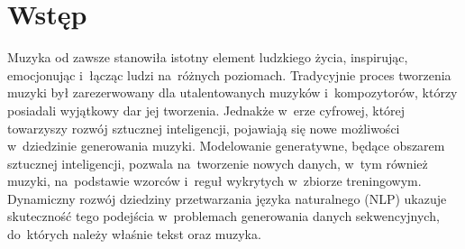 \documentclass[data-science]{agh-wi} %
\begin{document}
\tableofcontents   %
\newpage
\listoffigures     %
\listoftables      %
\mainmatter %
\chapter{Wstęp}
Muzyka od zawsze stanowiła istotny element ludzkiego życia, inspirując, emocjonując i~łącząc ludzi na~różnych poziomach. Tradycyjnie proces tworzenia muzyki był zarezerwowany dla utalentowanych muzyków i~kompozytorów, którzy posiadali wyjątkowy dar jej tworzenia. Jednakże w~erze cyfrowej, której towarzyszy rozwój sztucznej inteligencji, pojawiają się nowe możliwości w~dziedzinie generowania muzyki. Modelowanie generatywne, będące obszarem sztucznej inteligencji, pozwala na~tworzenie nowych danych, w~tym również muzyki, na~podstawie wzorców i~reguł wykrytych w~zbiorze treningowym. Dynamiczny rozwój dziedziny przetwarzania języka naturalnego (NLP) ukazuje skuteczność tego podejścia w~problemach generowania danych sekwencyjnych, do~których należy właśnie tekst oraz muzyka.
\end{document}
